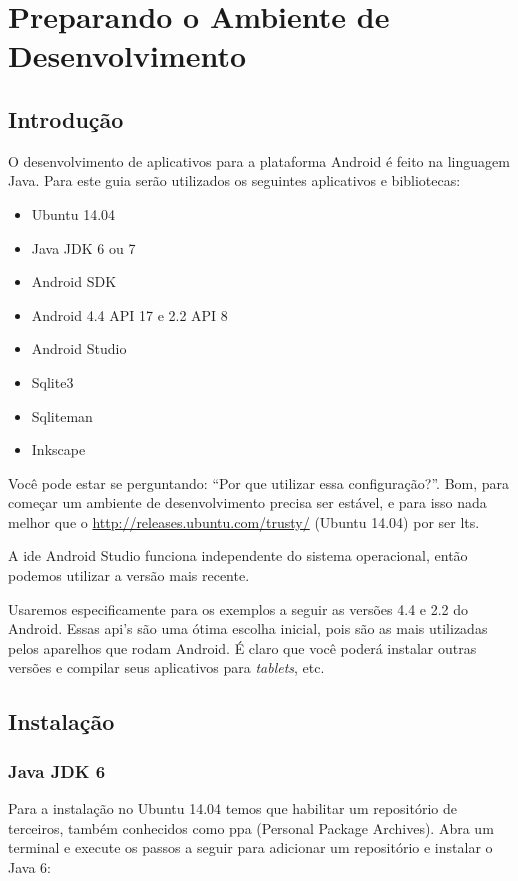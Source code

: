 \chapter{Preparando o Ambiente de Desenvolvimento}

\section{Introdução}

O desenvolvimento de aplicativos para a plataforma Android é feito na
linguagem Java. Para este guia serão utilizados os seguintes aplicativos
e bibliotecas:

\begin{itemize}
\item
  Ubuntu 14.04
\item
  Java JDK 6 ou 7
\item
  Android SDK
\item
  Android 4.4 API 17 e 2.2 API 8
\item
  Android Studio
\item
  Sqlite3
\item
  Sqliteman
\item
  Inkscape
\end{itemize}
Você pode estar se perguntando: ``Por que utilizar essa configuração?''.
Bom, para começar um ambiente de desenvolvimento precisa ser estável, e
para isso nada melhor que o \url{http://releases.ubuntu.com/trusty/}
(Ubuntu 14.04) por ser \gls{lts}.

A \gls{ide} Android Studio funciona independente do sistema operacional,
então podemos utilizar a versão mais recente.

Usaremos especificamente para os exemplos a seguir as versões 4.4 e 2.2
do Android. Essas \gls{api}'s são uma ótima escolha inicial, pois são as
mais utilizadas pelos aparelhos que rodam Android. É claro que você
poderá instalar outras versões e compilar seus aplicativos para
\emph{tablets}, etc.

\section{Instalação}

\subsection{Java JDK 6}

Para a instalação no Ubuntu 14.04 temos que habilitar um repositório de
terceiros, também conhecidos como \gls{ppa} (Personal Package Archives).
Abra um terminal e execute os passos a seguir para adicionar um
repositório e instalar o Java 6:

